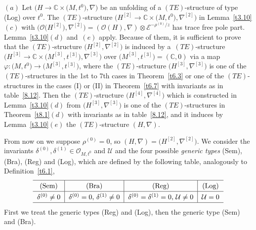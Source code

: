 \documentclass[pdftex]{sigma}%
\numberwithin{equation}{section}
\numberwithin{figure}{section}
\newcommand{\C}{{\mathbb C}}
\newcommand{\EE}{{\mathcal E}}
\newcommand{\OO}{{\mathcal O}}
\newcommand{\UU}{{\mathcal U}}
\newcommand{\nnn}{\nabla}
\begin{document}
$(a)$ Let $\big(H\to\C\times \big(M,t^0\big),\nnn\big)$ be an unfolding of
a $(TE)$-structure of type (Log) over $t^0$.
The $(TE)$-structure $\big(H^{[2]}\to\C\times \big(M,t^0\big),\nnn^{[2]}\big)$
in Lemma~\ref{t3.10}$(c)$ with
$\big(\OO\big(H^{[2]}\big),\nnn^{[2]}\big)=(\OO(H),\nnn)\otimes
\EE^{-\rho^{(0)}/z}$ has trace free pole part.
Lemma~\ref{t3.10}$(d)$ and~$(e)$ apply.
Because of them, it is sufficient to prove that the
$(TE)$-structure $\big(H^{[2]},\nnn^{[2]}\big)$ is induced by
a~$(TE)$-structure
$\big(H^{[3]}\to\C\times \big(M^{[3]},t^{[3]}\big),\nnn^{[3]}\big)$
over $\big(M^{[3]},t^{[3]}\big)=(\C,0)$
via a map $\varphi\colon \big(M,t^0\big)\to\big(M^{[3]},t^{[3]}\big) $,
where the $(TE)$-structure $\big(H^{[3]},\nnn^{[3]}\big)$
is one of the $(TE)$-structures in the 1st to 7th cases
in Theorem~\ref{t6.3} or one of the $(TE)$-structures
in the cases (I) or (II) in Theorem~\ref{t6.7} with invariants as in table~\eqref{8.12}.
Then the $(TE)$-structure $\big(H^{[4]},\nnn^{[4]}\big)$ which is
constructed in Lemma~\ref{t3.10}$(d)$ from $\big(H^{[3]},\nnn^{[3]}\big)$
is one of the $(TE)$-structures in Theorem~\ref{t8.1}$(d)$
with invariants as in table~\eqref{8.12},
and it induces by Lemma~\ref{t3.10}$(e)$ the $(TE)$-structure
$(H,\nnn)$.


From now on we suppose $\rho^{(0)}=0$, so
$(H,\nnn)=\big(H^{[2]},\nnn^{[2]}\big)$.
We consider the invariants $\delta^{(0)},\delta^{(1)}\in
\OO_{M,t^0}$ and $\UU$ and the four possible {\it generic types}
(Sem), (Bra), (Reg) and (Log),
which are defined by the following table,
analogously to Definition~\ref{t6.1},{\samepage
\[
\def\arraystretch{1.3}
\begin{tabular}{c|c|c|c}
\hline
(Sem) & (Bra) & (Reg)& (Log)
\\ \hline
$\delta^{(0)}\neq 0$ & $\delta^{(0)}=0$, $\delta^{(1)}\neq 0$ &
$\delta^{(0)}=\delta^{(1)}=0$, $\UU\neq 0$ & $\UU=0$
\\
\hline
\end{tabular}
\]
First we treat the generic types (Reg) and (Log),
then the generic type (Sem) and (Bra).}
\end{document}

